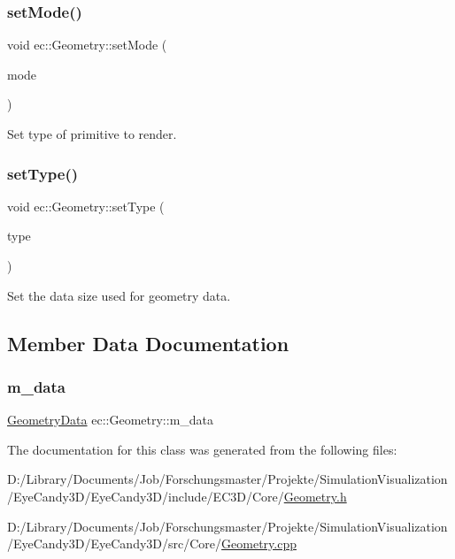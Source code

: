\subsubsection{\texorpdfstring{set\+Mode()}{setMode()}}
{\footnotesize\ttfamily void ec\+::\+Geometry\+::set\+Mode (\begin{DoxyParamCaption}\item[{G\+Lenum}]{mode }\end{DoxyParamCaption})\hspace{0.3cm}{\ttfamily [protected]}}



Set type of primitive to render. 

\mbox{\label{classec_1_1_geometry_a12c3da280ff11e86a8b07d18a23e0880}} 
\subsubsection{\texorpdfstring{set\+Type()}{setType()}}
{\footnotesize\ttfamily void ec\+::\+Geometry\+::set\+Type (\begin{DoxyParamCaption}\item[{G\+Lenum}]{type }\end{DoxyParamCaption})\hspace{0.3cm}{\ttfamily [protected]}}



Set the data size used for geometry data. 



\subsection{Member Data Documentation}
\mbox{\label{classec_1_1_geometry_aeb72a472b242d92496f0283cfee17fac}} 
\subsubsection{\texorpdfstring{m\+\_\+data}{m\_data}}
{\footnotesize\ttfamily \mbox{\hyperlink{classec_1_1_geometry_data}{Geometry\+Data}} ec\+::\+Geometry\+::m\+\_\+data\hspace{0.3cm}{\ttfamily [protected]}}



The documentation for this class was generated from the following files\+:\begin{DoxyCompactItemize}
\item 
D\+:/\+Library/\+Documents/\+Job/\+Forschungsmaster/\+Projekte/\+Simulation\+Visualization/\+Eye\+Candy3\+D/\+Eye\+Candy3\+D/include/\+E\+C3\+D/\+Core/\mbox{\hyperlink{_geometry_8h}{Geometry.\+h}}\item 
D\+:/\+Library/\+Documents/\+Job/\+Forschungsmaster/\+Projekte/\+Simulation\+Visualization/\+Eye\+Candy3\+D/\+Eye\+Candy3\+D/src/\+Core/\mbox{\hyperlink{_geometry_8cpp}{Geometry.\+cpp}}\end{DoxyCompactItemize}
